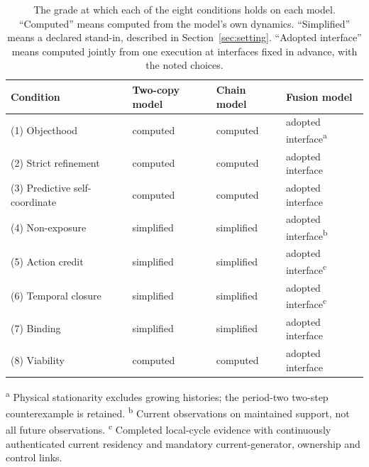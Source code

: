 \begin{table}[tbp]
\centering
\caption{The grade at which each of the eight conditions holds on each model. ``Computed'' means computed from the model's own dynamics. ``Simplified'' means a declared stand-in, described in Section~\ref{sec:setting}. ``Adopted interface'' means computed jointly from one execution at interfaces fixed in advance, with the noted choices.}
\label{tab:grades}
\small
\begin{tabularx}{\textwidth}{@{}>{\raggedright\arraybackslash}Xlll@{}}
\toprule
Condition & Two-copy model & Chain model & Fusion model \\
\midrule
(1) Objecthood & computed & computed & adopted interface\textsuperscript{a} \\
(2) Strict refinement & computed & computed & adopted interface \\
(3) Predictive self-coordinate & computed & computed & adopted interface \\
(4) Non-exposure & simplified & simplified & adopted interface\textsuperscript{b} \\
(5) Action credit & simplified & simplified & adopted interface\textsuperscript{c} \\
(6) Temporal closure & simplified & simplified & adopted interface\textsuperscript{c} \\
(7) Binding & simplified & simplified & adopted interface \\
(8) Viability & computed & computed & adopted interface \\
\bottomrule
\end{tabularx}
\par\smallskip
\begin{minipage}{\textwidth}
\footnotesize
\textsuperscript{a} Physical stationarity excludes growing histories; the period-two
two-step counterexample is retained.
\textsuperscript{b} Current observations on maintained support, not all future observations.
\textsuperscript{c} Completed local-cycle evidence with continuously authenticated
current residency and mandatory current-generator, ownership and control links.
\end{minipage}
\end{table}
